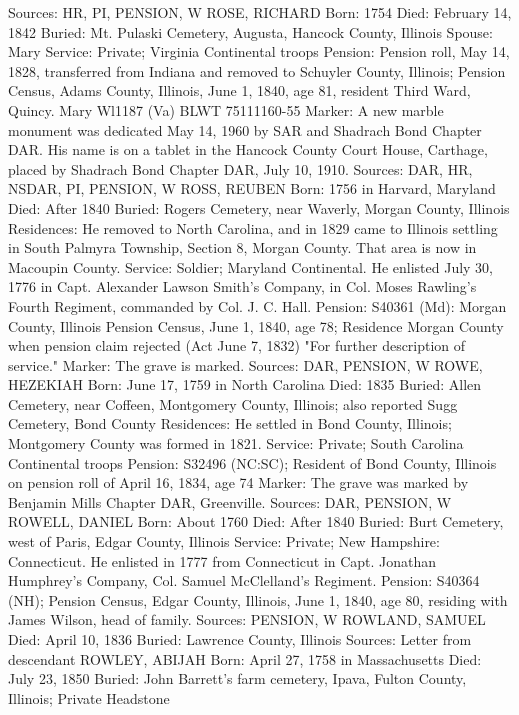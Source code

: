 Sources: HR, PI, PENSION, W 
ROSE, RICHARD
Born: 1754
Died: February 14, 1842 
Buried: Mt. Pulaski Cemetery, Augusta, Hancock County, Illinois 
Spouse: Mary 
Service: Private; Virginia Continental troops 
Pension: Pension roll, May 14, 1828, transferred from Indiana and removed to Schuyler County, Illinois; Pension Census, Adams County, Illinois, June 1, 1840, age 81, resident Third Ward, Quincy. Mary Wl1187 (Va) BLWT 75111­160-55 
Marker: A new marble monument was dedicated May 14, 1960 by SAR and Shadrach Bond Chapter DAR. His name is on a tablet in the Hancock County Court House, Carthage, placed by Shadrach Bond Chapter DAR, July 10, 1910. 
Sources: DAR, HR, NSDAR, PI, PENSION, W 
ROSS, REUBEN 
Born: 1756 in Harvard, Maryland 
Died: After 1840
Buried: Rogers Cemetery, near Waverly, Morgan County, Illinois 
Residences: He removed to North Carolina, and in 1829 came to Illinois settling in South Palmyra Township, Section 8, Morgan County. That area is now in Macoupin County. 
Service: Soldier; Maryland Continental. He enlisted July 30, 1776 in Capt. Alex­ander Lawson Smith's Company, in Col. Moses Rawling's Fourth Regiment, commanded by Col. J. C. Hall. 
Pension: S40361 (Md): Morgan County, Illinois Pension Census, June 1, 1840, age 78; Residence Morgan County when pension claim rejected (Act June 7, 1832) "For further description of service." 
Marker: The grave is marked. 
Sources: DAR, PENSION, W 
ROWE, HEZEKIAH
Born: June 17, 1759 in North Carolina
Died: 1835
Buried: Allen Cemetery, near Coffeen, Montgomery County, Illinois; also reported Sugg Cemetery, Bond County
Residences: He settled in Bond County, Illinois; Montgomery County was formed in 1821.
Service: Private; South Carolina Continental troops 
Pension: S32496 (NC:SC); Resident of Bond County, Illinois on pension roll of April 16, 1834, age 74
Marker: The grave was marked by Benjamin Mills Chapter DAR, Greenville.
Sources: DAR, PENSION, W 
ROWELL, DANIEL
Born: About 1760
Died:  After 1840
Buried: Burt Cemetery, west of Paris, Edgar County, Illinois
Service: Private; New Hampshire: Connecticut. He enlisted in 1777 from Connec­ticut in Capt. Jonathan Humphrey's Company, Col. Samuel McClelland's Regiment. 
Pension: S40364 (NH); Pension Census, Edgar County, Illinois, June 1, 1840, age 80, residing with James Wilson, head of family.
Sources: PENSION, W 
ROWLAND, SAMUEL 
Died: April 10, 1836 
Buried: Lawrence County, Illinois 
Sources: Letter from descendant 
ROWLEY, ABIJAH
Born: April 27, 1758 in Massachusetts
Died:  July 23, 1850
Buried: John Barrett's farm cemetery, Ipava, Fulton County, Illinois; Private Headstone

